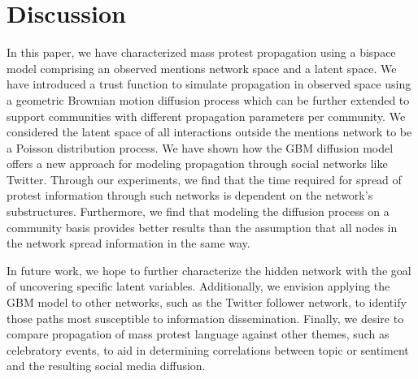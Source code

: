 
\section{Discussion}
In this paper, we have characterized mass protest propagation using a
bispace model comprising an observed mentions network space and a latent space. We have introduced a trust function to simulate propagation in observed space using a geometric Brownian motion diffusion process which can be further extended to support communities with different propagation parameters per community. We
considered the latent space of all interactions outside the mentions network to be a Poisson distribution process. We have shown how the GBM diffusion model offers a new approach for modeling propagation through social networks like Twitter. Through our experiments, we find that the time required for spread of protest information through such networks is dependent on the network's substructures. Furthermore, we find that modeling the diffusion process on a community basis provides better results than the assumption that all nodes in the network spread information in the same way.

In future work, we hope to further characterize the hidden network with the goal of uncovering specific latent variables. Additionally, we envision applying the GBM model to other networks, such as the Twitter follower network, to identify those paths most susceptible to information dissemination. Finally, we desire
to compare propagation of mass protest language against other themes,
such as celebratory events, to aid in determining correlations
between topic or sentiment and the resulting social media diffusion.



